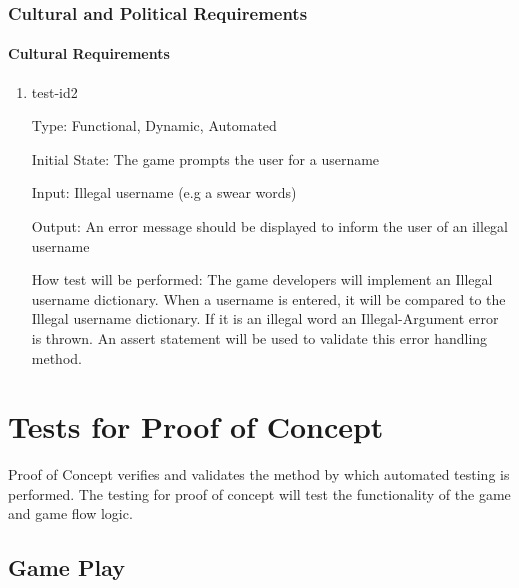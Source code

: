 \documentclass[12pt, titlepage]{article}
\begin{document}
	
	\subsubsection{Cultural and Political Requirements}
	
	\paragraph{Cultural Requirements}
	\begin{enumerate}
		\item{test-id2\\}
		
		Type: Functional, Dynamic, Automated 
		
		Initial State: The game prompts the user for a username
		
		Input: Illegal username (e.g a swear words)
		
		Output: An error message should be displayed to inform the user of an illegal username
		
		How test will be performed: The game developers will implement an Illegal username dictionary. When a username is entered, it will be compared to the Illegal username dictionary. If it is an illegal word an Illegal-Argument error is thrown. An assert statement will be used to validate this error handling method.
		
	\end{enumerate}
	
	
	
	\section{Tests for Proof of Concept}
	
	Proof of Concept verifies and validates the method by which automated testing is performed. The testing for proof of concept will test the functionality of the game and game flow logic. 
	
	\subsection{Game Play}
	
\end{document}
